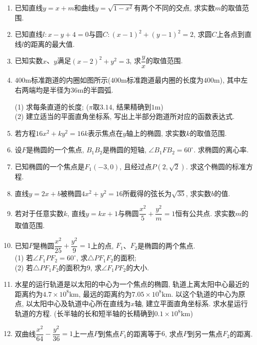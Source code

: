 \documentclass[10pt,a4paper]{article}
\begin{document}
\begin{enumerate}[1.]
\item 已知直线$y=x+m$和曲线$y=\sqrt{1-x^2}$有两个不同的交点, 求实数$m$的取值范围.
\item 已知直线$l: x-y+4=0$与圆$C: (x-1)^2+(y-1)^2=2$, 求圆$C$上各点到直线$l$的距离的最大值.
\item 已知实数$x$、$y$满足$(x-2)^2+y^2=3$, 求$\dfrac yx$的取值范围.
\item $400\text{m}$标准跑道的内圈如图所示($400\text{m}$标准跑道最内圈的长度为$400\text{m}$), 其中左右两端均是半径为$36\text{m}$的半圆弧.
\begin{center}
\end{center}
(1) 求每条直道的长度; ($\pi$取$3.14$, 结果精确到$1\text{m}$)\\
(2) 建立适当的平面直角坐标系, 写出上半部分跑道所对应的函数表达式.
\item 若方程$16x^2+ky^2=16k$表示焦点在$y$轴上的椭圆, 求实数$k$的取值范围.
\item 设$F$是椭圆的一个焦点, $B_1B_2$是椭圆的短轴, $\angle  B_1FB_2=60^\circ$. 求椭圆的离心率.
\item 已知椭圆的一个焦点是$F_1(-3, 0)$, 且经过点$P(2, \sqrt 2)$. 求这个椭圆的标准方程.
\item 直线$y=2x+b$被椭圆$4x^2+y^2=16$所截得的弦长为$\sqrt{35}$, 求实数$b$的值.
\item 若对于任意实数$k$, 直线$y=kx+1$与椭圆$\dfrac{x^2}5+\dfrac{y^2}m=1$恒有公共点. 求实数$m$的取值范围.
\item 已知$P$是椭圆$\dfrac{x^2}{25}+\dfrac{y^2}9=1$上的点, $F_1$、$F_2$是椭圆的两个焦点.\\
(1) 若$\angle F_1PF_2=60^\circ$, 求$\triangle PF_1F_2$的面积;\\
(2) 若$\triangle PF_1F_2$的面积为$9$, 求$\angle F_1PF_2$的大小.
\item 水星的运行轨道是以太阳的中心为一个焦点的椭圆, 轨道上离太阳中心最近的距离约为$4.7\times 10^8\text{km}$, 最远的距离约为$7.05\times 10^8\text{km}$. 以这个轨道的中心为原点, 以太阳中心及轨道中心所在直线为$x$轴, 建立平面直角坐标系. 求水星运行轨道的方程. (长半轴的长和短半轴的长精确到$0. 1\times 10^8\text{km}$)
\item 双曲线$\dfrac{x^2}{64}-\dfrac{y^2}{36}=1$上一点$P$到焦点$F_1$的距离等于$6$, 求点$P$到另一焦点$F_2$的距离.

\end{enumerate}
\end{document}
